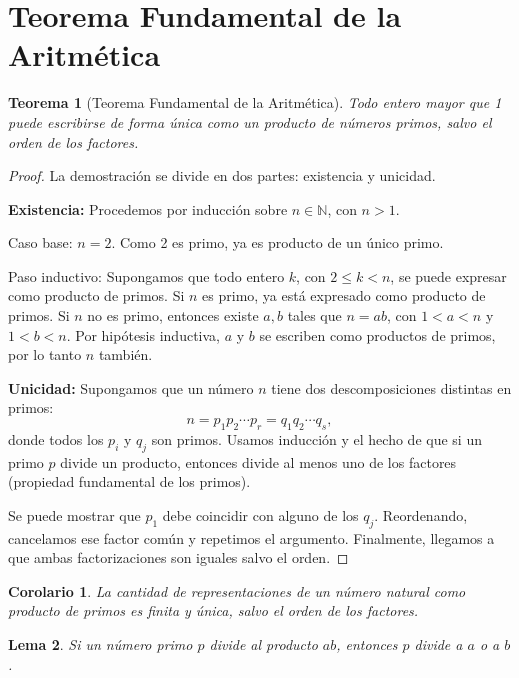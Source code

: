 \documentclass{article}
\theoremstyle{plain}
\newtheorem{theorem}{Teorema}[section]
\newtheorem{corollary}{Corolario}[theorem]
\newtheorem{lemma}[theorem]{Lema}
\begin{document}
\section{Teorema Fundamental de la Aritmética}

\begin{theorem}[Teorema Fundamental de la Aritmética]
Todo entero mayor que 1 puede escribirse de forma única como un producto de números primos, salvo el orden de los factores.
\end{theorem}

\begin{proof}
La demostración se divide en dos partes: existencia y unicidad.

\textbf{Existencia:} Procedemos por inducción sobre \(n \in \mathbb{N}\), con \(n > 1\).

Caso base: \(n = 2\). Como 2 es primo, ya es producto de un único primo.

Paso inductivo: Supongamos que todo entero \(k\), con \(2 \leq k < n\), se puede expresar como producto de primos. Si \(n\) es primo, ya está expresado como producto de primos. Si \(n\) no es primo, entonces existe \(a, b\) tales que \(n = ab\), con \(1 < a < n\) y \(1 < b < n\). Por hipótesis inductiva, \(a\) y \(b\) se escriben como productos de primos, por lo tanto \(n\) también.

\textbf{Unicidad:} Supongamos que un número \(n\) tiene dos descomposiciones distintas en primos:
\[
n = p_1 p_2 \cdots p_r = q_1 q_2 \cdots q_s,
\]
donde todos los \(p_i\) y \(q_j\) son primos. Usamos inducción y el hecho de que si un primo \(p\) divide un producto, entonces divide al menos uno de los factores (propiedad fundamental de los primos).

Se puede mostrar que \(p_1\) debe coincidir con alguno de los \(q_j\). Reordenando, cancelamos ese factor común y repetimos el argumento. Finalmente, llegamos a que ambas factorizaciones son iguales salvo el orden.

\end{proof}

\begin{corollary}
La cantidad de representaciones de un número natural como producto de primos es finita y única, salvo el orden de los factores.
\end{corollary}

\begin{lemma}
Si un número primo \(p\) divide al producto \(ab\), entonces \(p\) divide a \(a\) o a \(b\).
\end{lemma}
\end{document}

